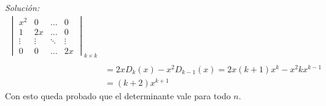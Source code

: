 \documentclass{article}
\newenvironment{solution}
    {\textit{Solución:}}
    {}
\begin{document}
\begin{solution}
\[\begin{aligned}
\begin{vmatrix}
x^2 & 0 & \dots & 0 \\
1 & 2x & \dots & 0 \\
\vdots & \vdots & \ddots & \vdots \\
0 & 0 & \dots & 2x
\end{vmatrix}_{k\times k} \\ \\
&= 2xD_k(x)-x^2D_{k-1}(x) = 2x(k+1)x^k - x^2kx^{k-1} \\
&= (k+2)x^{k+1}
\end{aligned}
\]
Con esto queda probado que el determinante vale para todo $n$.
\end{solution}


\end{document}
